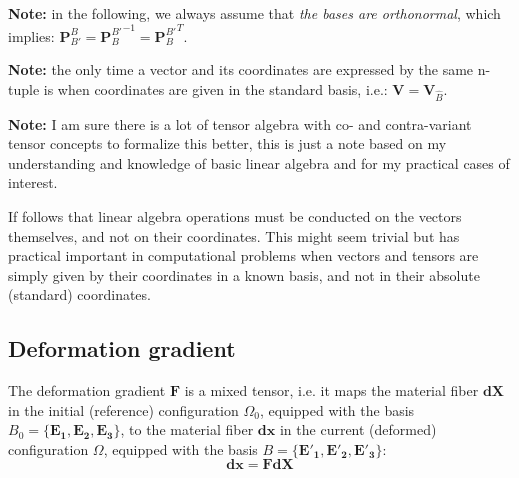 \documentclass[letterpaper,12pt,oneside]{report}
\begin{document}
\textbf{Note:} in the following, we always assume that \emph{the bases are orthonormal}, which implies: $\mathbf{P}_{B'}^B = {\mathbf{P}_B^{B'}}^{-1} = {\mathbf{P}_B^{B'}}^{T}$.


\textbf{Note:} the only time a vector and its coordinates are expressed by the same n-tuple is when coordinates are given in the standard basis, i.e.: $\mathbf{V}=\mathbf{V}_{\hat{B}}$. 

\textbf{Note:} I am sure there is a lot of tensor algebra with co- and contra-variant tensor concepts to formalize this better, this is just a note based on my understanding and knowledge of basic linear algebra and for my practical cases of interest. 

If follows that linear algebra operations must be conducted on the vectors themselves, and not on their coordinates. This might seem trivial but has practical important in computational problems when vectors and tensors are simply given by their coordinates in a known basis, and not in their absolute (standard) coordinates.


\subsection{Deformation gradient}
The deformation gradient $\mathbf{F}$ is a mixed tensor, i.e. it maps the material fiber $\mathbf{dX}$ in the initial (reference) configuration $\Omega_0$, equipped with the basis $B_0 = \{\mathbf{E_1},\mathbf{E_2},\mathbf{E_3}\} $, to the material fiber $\mathbf{dx}$ in the current (deformed) configuration $\Omega$, equipped with the basis $B = \{\mathbf{E'_1},\mathbf{E'_2},\mathbf{E'_3}\}$:
\begin{equation}
\mathbf{dx} = \mathbf{F} \mathbf{dX}
\label{eq:F}
\end{equation}
\end{document}
